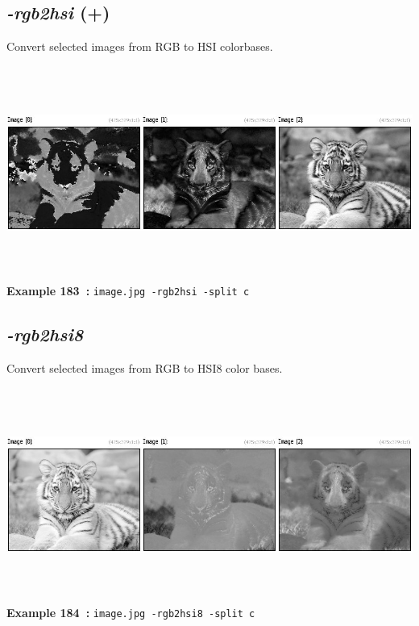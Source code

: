 \documentclass[a4paper,11pt,twoside]{book}
\begin{document}
\subsection{\emph{-rgb2hsi} (+)}\vspace*{-0.5em}
Convert selected images from RGB to HSI colorbases.
\begin{center}\includegraphics[keepaspectratio=true,height=7cm,width=\textwidth]{img/gmic_def183.jpg}\\
{\footnotesize \textbf{Example 183~:} \texttt{image.jpg -rgb2hsi -split c}}
\end{center}

\subsection{\emph{-rgb2hsi8} }\vspace*{-0.5em}
Convert selected images from RGB to HSI8 color bases.
\begin{center}\includegraphics[keepaspectratio=true,height=7cm,width=\textwidth]{img/gmic_def184.jpg}\\
{\footnotesize \textbf{Example 184~:} \texttt{image.jpg -rgb2hsi8 -split c}}
\end{center}
\end{document}
